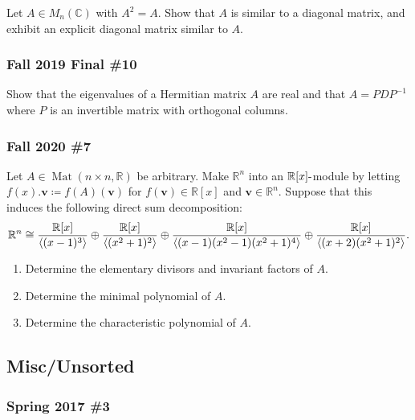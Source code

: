 Let \(A\in M_n({\mathbb{C}})\) with \(A^2 = A\). Show that \(A\) is
similar to a diagonal matrix, and exhibit an explicit diagonal matrix
similar to \(A\).

\hypertarget{fall-2019-final-10}{%
\subsubsection{Fall 2019 Final \#10}\label{fall-2019-final-10}}

Show that the eigenvalues of a Hermitian matrix \(A\) are real and that
\(A = PDP^{-1}\) where \(P\) is an invertible matrix with orthogonal
columns.

\hypertarget{fall-2020-7}{%
\subsubsection{Fall 2020 \#7}\label{fall-2020-7}}

Let \(A \in \operatorname{Mat}(n\times n, {\mathbb{R}})\) be arbitrary.
Make \({\mathbb{R}}^n\) into an \({\mathbb{R}}[x]{\hbox{-}}\)module by
letting \(f(x).\mathbf{v} \coloneqq f(A)(\mathbf{v})\) for
\(f(\mathbf{v})\in {\mathbb{R}}[x]\) and
\(\mathbf{v} \in {\mathbb{R}}^n\). Suppose that this induces the
following direct sum decomposition:
\begin{align*}
{\mathbb{R}}^n \cong
{ {\mathbb{R}}[x] \over \left\langle{ (x-1)^3 }\right\rangle }
\oplus
{ {\mathbb{R}}[x] \over \left\langle{ (x^2+1)^2 }\right\rangle }
\oplus
{ {\mathbb{R}}[x] \over \left\langle{ (x-1)(x^2-1)(x^2+1)^4 }\right\rangle }
\oplus
{ {\mathbb{R}}[x] \over \left\langle{ (x+2)(x^2+1)^2 }\right\rangle }
.\end{align*}

\begin{enumerate}
\def\labelenumi{\alph{enumi}.}
\item
  Determine the elementary divisors and invariant factors of \(A\).
\item
  Determine the minimal polynomial of \(A\).
\item
  Determine the characteristic polynomial of \(A\).
\end{enumerate}

\hypertarget{miscunsorted}{%
\subsection{Misc/Unsorted}\label{miscunsorted}}

\hypertarget{spring-2017-3}{%
\subsubsection{Spring 2017 \#3}\label{spring-2017-3}}

